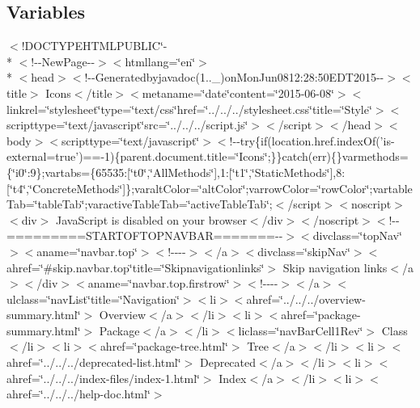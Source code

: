 \subsection*{Variables}
\begin{DoxyCompactItemize}
\item 
$<$!D\-O\-C\-T\-Y\-P\-E\-H\-T\-M\-L\-P\-U\-B\-L\-I\-C\char`\"{}-\/\\*
$<$!-\/-\/New\-Page-\/-\/$>$$<$htmllang=\char`\"{}en\char`\"{}$>$\\*
$<$head$>$$<$!-\/-\/Generatedbyjavadoc(1..\-\_)on\-Mon\-Jun0812\-:28\-:50\-E\-D\-T2015-\/-\/$>$$<$title$>$ Icons$<$/title$>$$<$metaname=\char`\"{}date\char`\"{}content=\char`\"{}2015-\/06-\/08\char`\"{}$>$$<$linkrel=\char`\"{}stylesheet\char`\"{}type=\char`\"{}text/css\char`\"{}href=\char`\"{}../../../stylesheet.\-css\char`\"{}title=\char`\"{}\-Style\char`\"{}$>$$<$scripttype=\char`\"{}text/javascript\char`\"{}src=\char`\"{}../../../script.\-js\char`\"{}$>$$<$/script$>$$<$/head$>$$<$body$>$$<$scripttype=\char`\"{}text/javascript\char`\"{}$>$$<$!-\/-\/try\{if(location.\-href.\-index\-Of('is-\/external=true')==-\/1)\{parent.\-document.\-title=\char`\"{}\-Icons\char`\"{};\}\}catch(err)\{\}varmethods=\{\char`\"{}i0\char`\"{}\-:9\};vartabs=\{65535\-:\mbox{[}\char`\"{}t0\char`\"{},\char`\"{}\-All\-Methods\char`\"{}\mbox{]},1\-:\mbox{[}\char`\"{}t1\char`\"{},\char`\"{}\-Static\-Methods\char`\"{}\mbox{]},8\-:\mbox{[}\char`\"{}t4\char`\"{},\char`\"{}\-Concrete\-Methods\char`\"{}\mbox{]}\};varalt\-Color=\char`\"{}alt\-Color\char`\"{};varrow\-Color=\char`\"{}row\-Color\char`\"{};vartable\-Tab=\char`\"{}table\-Tab\char`\"{};varactive\-Table\-Tab=\char`\"{}active\-Table\-Tab\char`\"{};$<$/script$>$$<$noscript$>$$<$div$>$ Java\-Script is disabled on your browser$<$/div$>$$<$/noscript$>$$<$!-\/-\/=========\-S\-T\-A\-R\-T\-O\-F\-T\-O\-P\-N\-A\-V\-B\-A\-R=======-\/-\/$>$$<$divclass=\char`\"{}top\-Nav\char`\"{}$>$$<$aname=\char`\"{}navbar.\-top\char`\"{}$>$$<$!-\/-\/-\/-\/$>$$<$/a$>$$<$divclass=\char`\"{}skip\-Nav\char`\"{}$>$$<$ahref=\char`\"{}\#skip.\-navbar.\-top\char`\"{}title=\char`\"{}\-Skipnavigationlinks\char`\"{}$>$ Skip navigation links$<$/a$>$$<$/div$>$$<$aname=\char`\"{}navbar.\-top.\-firstrow\char`\"{}$>$$<$!-\/-\/-\/-\/$>$$<$/a$>$$<$ulclass=\char`\"{}nav\-List\char`\"{}title=\char`\"{}\-Navigation\char`\"{}$>$$<$li$>$$<$ahref=\char`\"{}../../../overview-\/summary.\-html\char`\"{}$>$ Overview$<$/a$>$$<$/li$>$$<$li$>$$<$ahref=\char`\"{}package-\/summary.\-html\char`\"{}$>$ Package$<$/a$>$$<$/li$>$$<$liclass=\char`\"{}nav\-Bar\-Cell1\-Rev\char`\"{}$>$ Class$<$/li$>$$<$li$>$$<$ahref=\char`\"{}package-\/tree.\-html\char`\"{}$>$ Tree$<$/a$>$$<$/li$>$$<$li$>$$<$ahref=\char`\"{}../../../deprecated-\/list.\-html\char`\"{}$>$ Deprecated$<$/a$>$$<$/li$>$$<$li$>$$<$ahref=\char`\"{}../../../index-\/files/index-\/1.\-html\char`\"{}$>$ Index$<$/a$>$$<$/li$>$$<$li$>$$<$ahref=\char`\"{}../../../help-\/doc.\-html\char`\"{}$>$ $$
\end{DoxyCompactItemize}
